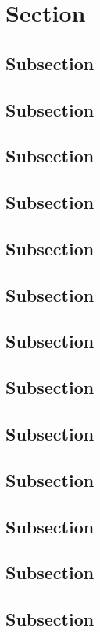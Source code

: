 \documentclass[paper=a5,twoside,fontsize=10pt, DIV=calc, headings=small, bibliography=totoc, listof=totoc]{scrbook}
\begin{document}
\section{Section}

\subsection{Subsection}
\label{ssec:example}
\blindtext

\subsection{Subsection}
\subsection{Subsection}
\subsection{Subsection}
\subsection{Subsection}
\subsection{Subsection}
\subsection{Subsection}
\subsection{Subsection}
\subsection{Subsection}
\subsection{Subsection}
\subsection{Subsection}
\subsection{Subsection}
\subsection{Subsection}
\end{document}
